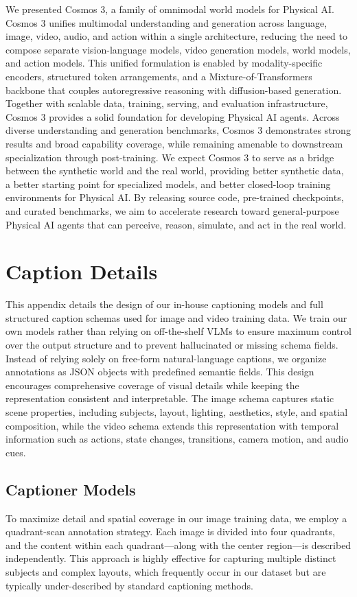 \documentclass{llmxive}
\begin{document}
We presented Cosmos 3, a family of omnimodal world models for Physical AI. Cosmos 3 unifies multimodal understanding and generation across language, image, video, audio, and action within a single architecture, reducing the need to compose separate vision-language models, video generation models, world models, and action models. This unified formulation is enabled by modality-specific encoders, structured token arrangements, and a Mixture-of-Transformers backbone that couples autoregressive reasoning with diffusion-based generation. Together with scalable data, training, serving, and evaluation infrastructure, Cosmos 3 provides a solid foundation for developing Physical AI agents. Across diverse understanding and generation benchmarks, Cosmos 3 demonstrates strong results and broad capability coverage, while remaining amenable to downstream specialization through post-training. We expect Cosmos 3 to serve as a bridge between the synthetic world and the real world, providing better synthetic data, a better starting point for specialized models, and better closed-loop training environments for Physical AI. By releasing source code, pre-trained checkpoints, and curated benchmarks, we aim to accelerate research toward general-purpose Physical AI agents that can perceive, reason, simulate, and act in the real world.



\appendix

\section{Caption Details}
\label{appendix:captioning_details}
This appendix details the design of our in-house captioning models and full structured caption schemas used for image and video training data. We train our own models rather than relying on off-the-shelf VLMs to ensure maximum control over the output structure and to prevent hallucinated or missing schema fields. Instead of relying solely on free-form natural-language captions, we organize annotations as JSON objects with predefined semantic fields. This design encourages comprehensive coverage of visual details while keeping the representation consistent and interpretable. The image schema captures static scene properties, including subjects, layout, lighting, aesthetics, style, and spatial composition, while the video schema extends this representation with temporal information such as actions, state changes, transitions, camera motion, and audio cues.

\subsection{Captioner Models}
To maximize detail and spatial coverage in our image training data, we employ a quadrant-scan annotation strategy. Each image is divided into four quadrants, and the content within each quadrant---along with the center region---is described independently. This approach is highly effective for capturing multiple distinct subjects and complex layouts, which frequently occur in our dataset but are typically under-described by standard captioning methods.
\end{document}
